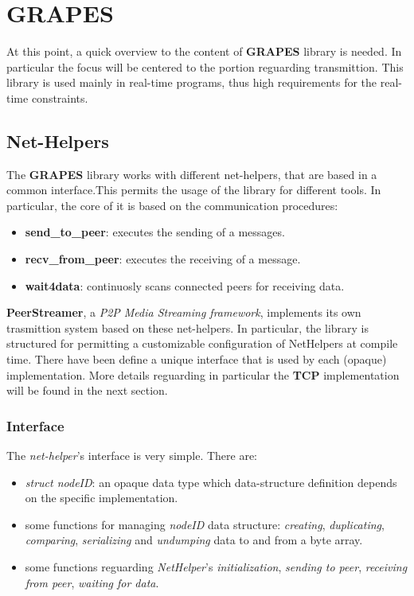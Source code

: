 \section{GRAPES}
\label{ch:grapes}
At this point, a quick overview to the content of \textbf{GRAPES} library is needed. In particular the focus will be centered to the portion reguarding transmittion. This library is used mainly in real-time programs, thus
high requirements for the real-time constraints.



\subsection{Net-Helpers}
The \textbf{GRAPES} library works with different net-helpers, that are based
in a common interface.This permits the usage of the library for different
tools. In particular, the core of it is based on the communication procedures:
\begin{itemize}
  \item \textbf{send\_to\_peer}: executes the sending of a messages.
  \item \textbf{recv\_from\_peer}: executes the receiving of a message. 
  \item \textbf{wait4data}:  continuosly scans connected peers for receiving data.
\end{itemize}
\textbf{PeerStreamer}, a \textit{P2P Media Streaming framework}, implements its own trasmittion system based on these net-helpers.
In particular, the library is structured for permitting a customizable configuration of NetHelpers at compile time. 
There have been define a unique interface that is used by each (opaque)
implementation. More details reguarding in particular the \textbf{TCP} implementation will be found in
the next section.

\subsubsection{Interface}
The \textit{net-helper}'s interface is very simple. There are:
\begin{itemize}
\item \textit{struct nodeID}: an opaque data type which data-structure definition depends on the specific implementation.
\item some functions for managing \textit{nodeID} data structure: \textit{creating}, \textit{duplicating}, \textit{comparing}, \textit{serializing} and
\textit{undumping} data to and from a byte array.
\item some functions reguarding \textit{NetHelper}'s \textit{initialization},
\textit{sending to peer}, \textit{receiving from peer}, \textit{waiting for data}.
\end{itemize}

